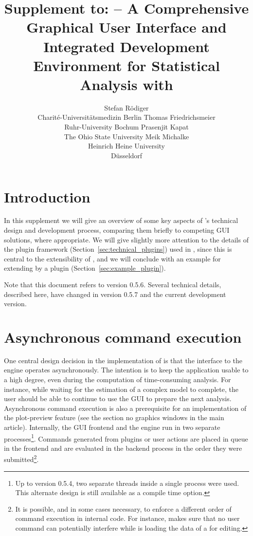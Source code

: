 \documentclass[article,shortnames]{jss}
\author{Stefan R\"odiger\\Charit\'e-Universit\"{a}tsmedizin Berlin
	\And Thomas Friedrichsmeier\\Ruhr-University Bochum
	\AND Prasenjit Kapat\\The Ohio State University
	\And Meik Michalke\\Heinrich Heine University\\D\"usseldorf
}
\title{Supplement to:\linebreak 
  \pkg{RKWard} -- A Comprehensive Graphical User Interface and Integrated Development Environment for Statistical Analysis with \proglang{R}}
\begin{document}
%
\section{Introduction}
In this supplement we will give an overview of some key aspects of 's
technical design and development process, comparing them briefly to competing GUI solutions, where appropriate.
We will give slightly more attention to the details of the
plugin framework (Section~\ref{sec:technical_plugins}) used in , since this is central to the extensibility of
, and we will conclude with an example for extending  by a plugin (Section~\ref{sec:example_plugin}).

Note that this document refers to  version 0.5.6. Several technical details, described here, have changed
in  version 0.5.7 and the current development version.

\section{Asynchronous command execution}
\label{sec:technical_asynchronous}
One central design decision in the implementation of  is that the
interface to the  engine operates asynchronously. The intention is to
keep the application usable to a high degree, even during the computation of
time-consuming analysis. For instance, while waiting for the estimation of a
complex model to complete, the user should be able to continue to use the GUI to
prepare the next analysis. Asynchronous command execution is also a prerequisite
for an implementation of the plot-preview feature (see the section no graphics windows
in the main article). Internally, the GUI frontend and the  engine run in two separate processes\footnote{
    Up to  version 0.5.4, two separate threads inside a single process were used. This alternate design is still
    available as a compile time option.
}. Commands generated from plugins or user actions are placed in queue in the frontend and are evaluated in
the backend process in the order they were submitted\footnote{
    It is possible, and in some cases necessary, to enforce a different order of command execution in
    internal code. For instance,  makes sure that no user command can
    potentially interfere while  is loading the data of a  for
    editing.
}.
\end{document}
